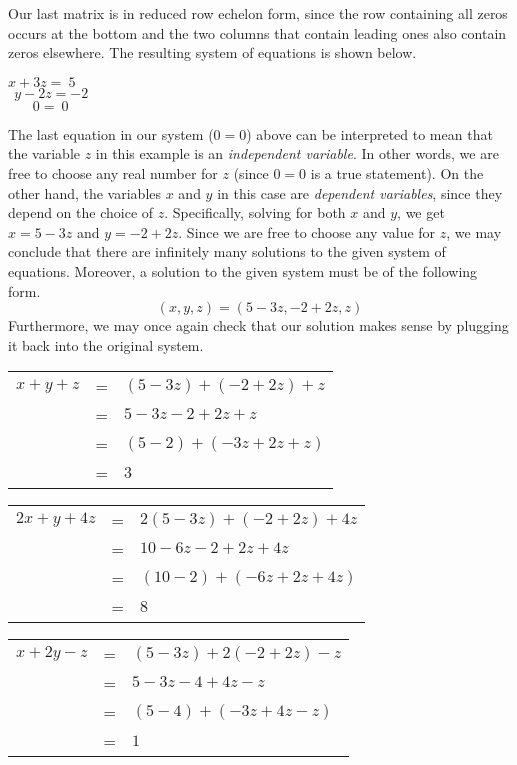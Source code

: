 \documentclass[12pt]{book}
\theoremstyle{definition}
\begin{document}
Our last matrix is in reduced row echelon form, since the row containing all zeros occurs at the bottom and the two columns that contain leading ones also contain zeros elsewhere.  The resulting system of equations is shown below.
\begin{center}
$x+3z=~5$\\
$~~y-2z=-2$\\
$~~~~~~~~0=~0$
\end{center}
The last equation in our system ($0=0$) above can be interpreted to mean that the variable $z$ in this example is an {\it independent variable}.  In other words, we are free to choose any real number for $z$ (since $0=0$ is a true statement).  On the other hand, the variables $x$ and $y$ in this case are {\it dependent variables}, since they depend on the choice of $z$.  Specifically, solving for both $x$ and $y$, we get $x=5-3z$ and $y=-2+2z$.  Since we are free to choose any value for $z$, we may conclude that there are infinitely many solutions to the given system of equations.  Moreover, a solution to the given system must be of the following form.
$$(x,y,z)=(5-3z,-2+2z,z)$$
Furthermore, we may once again check that our solution makes sense by plugging it back into the original system.
\begin{center}
\begin{tabular}{ccl}
$x+y+z$&=&$(5-3z)+(-2+2z)+z$\\
&=&$5-3z-2+2z+z$\\
&=&$(5-2)+(-3z+2z+z)$\\
&=&$3$%
\end{tabular}
\end{center}
\begin{center}
\begin{tabular}{ccl}
$2x+y+4z$&=&$2(5-3z)+(-2+2z)+4z$\\
&=&$10-6z-2+2z+4z$\\
&=&$(10-2)+(-6z+2z+4z)$\\
&=&$8$%
\end{tabular}
\end{center}
\begin{center}
\begin{tabular}{ccl}
$x+2y-z$&=&$(5-3z)+2(-2+2z)-z$\\
&=&$5-3z-4+4z-z$\\
&=&$(5-4)+(-3z+4z-z)$\\
&=&$1$
\end{tabular}
\end{center}
\end{document}
